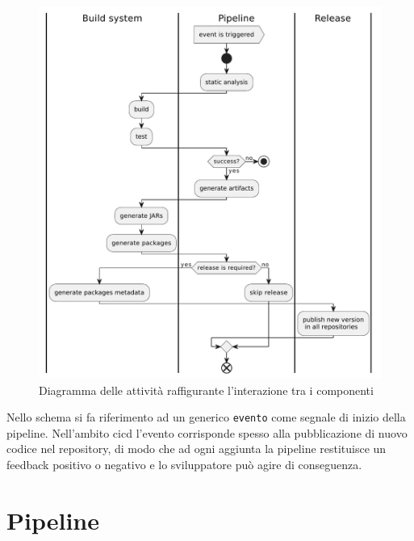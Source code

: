 \begin{figure}[H]
	\centering
	\includegraphics[width=.9\linewidth]{figures/activity-interaction-diagram.pdf}
	\caption{Diagramma delle attività raffigurante l'interazione tra i componenti}
	\label{fig:activity-interaction-diagram}
\end{figure}

Nello schema si fa riferimento ad un generico \texttt{evento} come segnale di inizio della pipeline. Nell'ambito \ac{cicd} l'evento corrisponde spesso alla pubblicazione di nuovo codice nel repository, di modo che ad ogni aggiunta la pipeline restituisce un feedback positivo o negativo e lo sviluppatore può agire di conseguenza.

\section{Pipeline}

